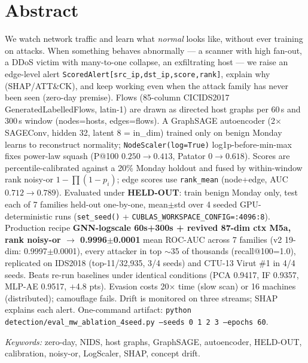 \documentclass[12pt,a4paper,oneside]{report}
\begin{document}
\chapter*{Abstract}
We watch network traffic and learn what \textit{normal} looks like, without ever training on attacks. When something behaves abnormally — a scanner with high fan-out, a DDoS victim with many-to-one collapse, an exfiltrating host — we raise an edge-level alert \texttt{ScoredAlert[src\_ip,dst\_ip,score,rank]}, explain why (SHAP/ATT\&CK), and keep working even when the attack family has never been seen (zero-day premise). Flows (85-column CICIDS2017 GeneratedLabelledFlows, latin-1) are drawn as directed host graphs per 60\,s and 300\,s window (nodes=hosts, edges=flows). A GraphSAGE autoencoder (2$\times$SAGEConv, hidden 32, latent 8 = in\_dim) trained only on benign Monday learns to reconstruct normality; \texttt{NodeScaler(log=True)} log1p-before-min-max fixes power-law squash (P@100 $0.250\rightarrow0.413$, Patator $0\rightarrow0.618$). Scores are percentile-calibrated against a 20\% Monday holdout and fused by within-window rank noisy-or $1-\prod(1-p_i)$; edge scores use \texttt{rank\_mean} (node+edge, AUC $0.712\rightarrow0.789$). Evaluated under \textbf{HELD-OUT}: train benign Monday only, test each of 7 families held-out one-by-one, mean$\pm$std over 4 seeded GPU-deterministic runs (\texttt{set\_seed()} + \texttt{CUBLAS\_WORKSPACE\_CONFIG=:4096:8}). Production recipe \textbf{GNN-logscale 60s+300s + revived 87-dim ctx M5a, rank noisy-or $\rightarrow$ 0.9996$\pm$0.0001} mean ROC-AUC across 7 families (v2 19-dim: 0.9997$\pm$0.0001), every attacker in top $\sim$35 of thousands (recall@100=1.0), replicated on IDS2018 (top-11/32,935, 3/4 seeds) and CTU-13 Virut \#1 in 4/4 seeds. Beats re-run baselines under identical conditions (PCA 0.9417, IF 0.9357, MLP-AE 0.9517, $+$4.8 pts). Evasion costs 20$\times$ time (slow scan) or 16 machines (distributed); camouflage fails. Drift is monitored on three streams; SHAP explains each alert. One-command artifact: \texttt{python detection/eval\_mw\_ablation\_4seed.py --seeds 0 1 2 3 --epochs 60}.

\medskip
\noindent\textit{Keywords:} zero-day, NIDS, host graphs, GraphSAGE, autoencoder, HELD-OUT, calibration, noisy-or, LogScaler, SHAP, concept drift.

\tableofcontents
\listoftables
\listoffigures
\end{document}
